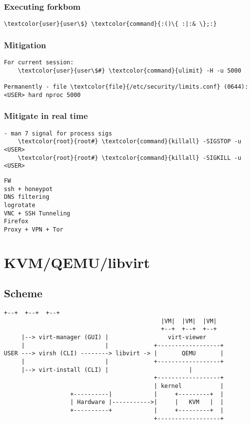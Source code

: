 \documentclass[10pt, a4paper, onecolumn, openany]{book} %
\begin{document}
\subsection{Executing forkbom}
\begin{Verbatim}[commandchars=\\\{\}]
    \textcolor{user}{user\$} \textcolor{command}{:()\{ :|:& \};:}
\end{Verbatim}
\subsection{Mitigation}
\begin{Verbatim}[commandchars=\\\{\}]
For current session:
    \textcolor{user}{user\$#} \textcolor{command}{ulimit} -H -u 5000

Permanently - file \textcolor{file}{/etc/security/limits.conf} (0644):
<USER> hard nproc 5000
\end{Verbatim}
\subsection{Mitigate in real time}
\begin{Verbatim}[commandchars=\\\{\}]
- man 7 signal for process sigs
    \textcolor{root}{root#} \textcolor{command}{killall} -SIGSTOP -u <USER>
    \textcolor{root}{root#} \textcolor{command}{killall} -SIGKILL -u <USER>
\end{Verbatim}

\begin{Verbatim}[commandchars=\\\{\}]
FW
ssh + honeypot
DNS filtering
logrotate
VNC + SSH Tunneling
Firefox
Proxy + VPN + Tor
\end{Verbatim}



\chapter{KVM/QEMU/libvirt}
\section{Scheme}
\begin{Verbatim}[commandchars=\\\{\}]
                                             +--+  +--+  +--+
                                             |VM|  |VM|  |VM|
                                             +--+  +--+  +--+
     |--> virt-manager (GUI) |                 virt-viewer
     |                       |             +------------------+
USER ---> virsh (CLI) --------> libvirt -> |       QEMU       |
     |                       |             +------------------+
     |--> virt-install (CLI) |                       |
                                           +------------------+
                                           | kernel           |
                   +----------|            |     +---------+  |
                   | Hardware |----------->|     |   KVM   |  |
                   +----------+            |     +---------+  |
                                           +------------------+
\end{Verbatim}
\end{document}

